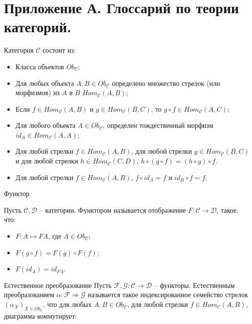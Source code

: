 \section{Приложение А. Глоссарий по теории категорий.}

\begin{defin}

  Категория $\mathcal{C}$ состоит из:
  \begin{itemize}
    \item Класса объектов $Ob_{\mathcal{C}}$;
    \item Для любых объекта $A, B \in Ob_{\mathcal{C}}$ определено множество стрелок (или морфизмов) из $A$ в $B$ $Hom_{\mathcal{C}}(A, B)$;
    \item Если $f \in Hom_{\mathcal{C}}(A, B)$ и $g \in Hom_{\mathcal{C}}(B,C)$, то $g \circ f \in Hom_{\mathcal{C}}(A, C)$;
    \item Для любого объекта $A \in Ob_{\mathcal{C}}$, определен тождественный морфизм $id_A \in Hom_{\mathcal{C}}(A, A)$;
    \item Для любой стрелки $f \in Hom_{\mathcal{C}}(A, B)$, для любой стрелки $g \in Hom_{\mathcal{C}}(B,C)$ и для любой стрелки $h \in Hom_{\mathcal{C}}(C,D)$, $h \circ (g \circ f) = (h \circ g) \circ f$.
    \item Для любой стрелки $f \in Hom_{\mathcal{C}}(A, B)$, $f \circ id_A = f$ и $id_B \circ f = f$.
  \end{itemize}
\end{defin}

\begin{defin} Функтор

  Пусть $\mathcal{C}, \mathcal{D}$ -- категории. Функтором называется отображение $F : \mathcal{C} \to \mathcal{D}$, такое, что:
  \begin{itemize}
    \item $F : A \mapsto F A$, где $A \in Ob_{\mathcal{C}}$;
    \item $F (g \circ f) = F(g) \circ F(f)$;
    \item $F (id_A) = id_{F A}$.
  \end{itemize}
\end{defin}

\begin{defin} Естественное преобразование
  Пусть $\mathcal{F}, \mathcal{G} : \mathcal{C} \to \mathcal{D}$ -- функторы.
  Естественным преобразованием $\alpha : \mathcal{F} \Rightarrow \mathcal{G}$ называется такое индексированное семейство стрелок $(\alpha_{X})_{X \in Ob_{\mathcal{C}}}$,
что для любых $A, B \in Ob_{\mathcal{C}}$, для любой стрелки $f \in Hom_{\mathcal{C}}(A, B)$, диаграмма коммутирует:

\end{defin}


